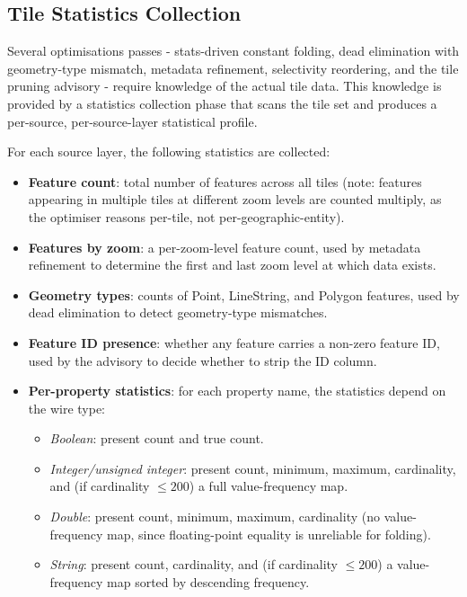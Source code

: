 \subsection{Tile Statistics Collection}\label{sub_tile_statistics}

Several optimisations passes - stats-driven constant folding, dead elimination with geometry-type mismatch, metadata refinement, selectivity reordering, and the tile pruning advisory - require knowledge of the actual tile data.
This knowledge is provided by a statistics collection phase that scans the tile set and produces a per-source, per-source-layer statistical profile.

For each source layer, the following statistics are collected:

\begin{itemize}
    \item \textbf{Feature count}: total number of features across all tiles (note: features appearing in multiple tiles at different zoom levels are counted multiply, as the optimiser reasons per-tile, not per-geographic-entity).
    \item \textbf{Features by zoom}: a per-zoom-level feature count, used by metadata refinement to determine the first and last zoom level at which data exists.
    \item \textbf{Geometry types}: counts of Point, LineString, and Polygon features, used by dead elimination to detect geometry-type mismatches.
    \item \textbf{Feature ID presence}: whether any feature carries a non-zero feature ID, used by the advisory to decide whether to strip the ID column.
    \item \textbf{Per-property statistics}: for each property name, the statistics depend on the wire type:
    \begin{itemize}
        \item \emph{Boolean}: present count and true count.
        \item \emph{Integer/unsigned integer}: present count, minimum, maximum, cardinality, and (if cardinality $\leq 200$) a full value-frequency map.
        \item \emph{Double}: present count, minimum, maximum, cardinality (no value-frequency map, since floating-point equality is unreliable for folding).
        \item \emph{String}: present count, cardinality, and (if cardinality $\leq 200$) a value-frequency map sorted by descending frequency.
    \end{itemize}
\end{itemize}


